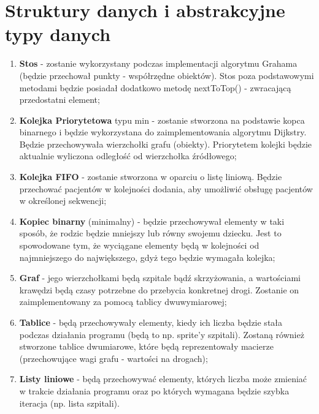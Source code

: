\documentclass{article}
\begin{document}
\section{Struktury danych i abstrakcyjne typy danych}
{\fontsize{12}{12}\selectfont
\begin{enumerate}
    \item \textbf{Stos}
    - zostanie wykorzystany podczas implementacji algorytmu Grahama (będzie przechował punkty - współrzędne obiektów). Stos poza podstawowymi metodami będzie posiadał dodatkowo metodę nextToTop() - zwracającą przedostatni element;
    
    \item \textbf{Kolejka Priorytetowa}
    typu min - zostanie stworzona na podstawie kopca binarnego i będzie wykorzystana do zaimplementowania algorytmu Dijkstry. Będzie przechowywała wierzchołki grafu (obiekty). Priorytetem kolejki będzie aktualnie wyliczona odległość od wierzchołka źródłowego;

    \item \textbf{Kolejka FIFO}
    - zostanie stworzona w oparciu o listę liniową. Będzie przechować pacjentów w kolejności dodania, aby umożliwić obsługę pacjentów w określonej sekwencji;
    
    \item \textbf{Kopiec binarny}
    (minimalny) - będzie przechowywał elementy w taki sposób, że rodzic będzie mniejszy lub równy swojemu dziecku. Jest to spowodowane tym, że wyciągane elementy będą w kolejności od najmniejszego do największego, gdyż tego będzie wymagała kolejka;
    
    \item \textbf{Graf}
    - jego wierzchołkami będą szpitale bądź skrzyżowania, a wartościami krawędzi będą czasy potrzebne do przebycia konkretnej drogi. Zostanie on zaimplementowany za pomocą tablicy dwuwymiarowej;
    
    \item \textbf{Tablice}
    - będą przechowywały elementy, kiedy ich liczba będzie stała podczas działania programu (będą to np. sprite'y szpitali). Zostaną również stworzone tablice dwumiarowe, które będą reprezentowały macierze (przechowujące wagi grafu - wartości na drogach);
    
    \item \textbf{Listy liniowe}
    - będą przechowywać elementy, których liczba może zmieniać w trakcie działania programu oraz po których wymagana będzie szybka iteracja (np. lista szpitali). 

    

\end{enumerate}
}
\end{document}
